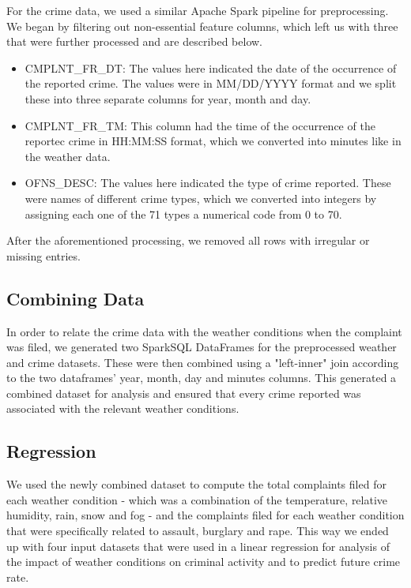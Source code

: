 \documentclass[conference]{IEEEtran}
\begin{document}
For the crime data, we used a similar Apache Spark pipeline for preprocessing.
We began by filtering out non-essential feature columns, which left us with three that were further processed and are described below.
\begin{itemize}
    \item CMPLNT\_FR\_DT: The values here indicated the date of the occurrence of the reported crime.
    The values were in MM/DD/YYYY format and we split these into three separate columns for year, month and day.
    \item CMPLNT\_FR\_TM: This column had the time of the occurrence of the reportec crime in HH:MM:SS format, which we converted into minutes like in the weather data.
    \item OFNS\_DESC: The values here indicated the type of crime reported.
    These were names of different crime types, which we converted into integers by assigning each one of the 71 types a numerical code from 0 to 70.
\end{itemize}

After the aforementioned processing, we removed all rows with irregular or missing entries.

\subsection{Combining Data}
In order to relate the crime data with the weather conditions when the complaint was filed, we generated two SparkSQL DataFrames for the preprocessed weather and crime datasets. 
These were then combined using a "left-inner" join according to the two dataframes' year, month, day and minutes columns. 
This generated a combined dataset for analysis and ensured that every crime reported was associated with the relevant weather conditions.

\subsection{Regression}
We used the newly combined dataset to compute the total complaints filed for each weather condition - which was a combination of the temperature, relative humidity, rain, snow and fog - and the complaints filed for each weather condition that were specifically related to assault, burglary and rape.
This way we ended up with four input datasets that were used in a linear regression for analysis of the impact of weather conditions on criminal activity and to predict future crime rate.
\end{document}
